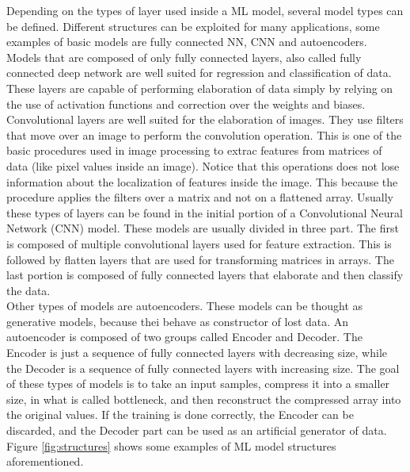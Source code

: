 \documentclass[12pt]{report}
\begin{document}
Depending on the types of layer used inside a ML model, several model types can be defined. Different structures can be exploited for many applications, some examples of basic models are fully connected NN, CNN and autoencoders. \\
Models that are composed of only fully connected layers, also called fully connected deep network are well suited for regression and classification of data. These layers are capable of performing elaboration of data simply by relying on the use of activation functions and correction over the weights and biases. 
Convolutional layers are well suited for the elaboration of images. They use filters that move over an image to perform the convolution operation. This is one of the basic procedures used in image processing to extrac features from matrices of data (like pixel values inside an image). Notice that this operations does not lose information about the localization of features inside the image. This because the procedure applies the filters over a matrix and not on a flattened array. Usually these types of layers can be found in the initial portion of a Convolutional Neural Network (CNN) model. These models are usually divided in three part. The first is composed of multiple convolutional layers used for feature extraction. This is followed by flatten layers that are used for transforming matrices in arrays. The last portion is composed of fully connected layers that elaborate and then classify the data.	\\
Other types of models are autoencoders. These models can be thought as generative models, because thei behave as constructor of lost data. An autoencoder is composed of two groups called Encoder and Decoder. The Encoder is just a sequence of fully connected layers with decreasing size, while the Decoder is a sequence of fully connected layers with increasing size. The goal of these types of models is to take an input samples, compress it into a smaller size, in what is called bottleneck, and then reconstruct the compressed array into the original values. If the training is done correctly, the Encoder can be discarded, and the Decoder part can be used as an artificial generator of data.\\
Figure \ref{fig:structures} shows some examples of ML model structures aforementioned.
\end{document}
